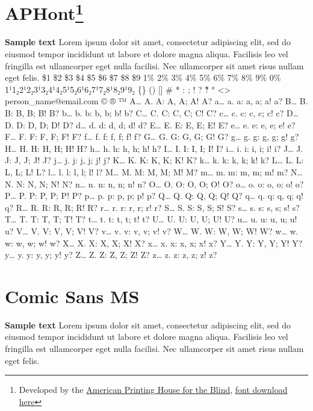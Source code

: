 \pagebreak
\hypertarget{trouble7}{}\section[APHont]{APHont\footnote{\raggedright Developed by the \href{https://www.aph.org/resources/large-print-guidelines/}{American Printing House for the Blind}, \href{https://www.aph.org/resources/large-print-guidelines/}{font download here}}}\label{trouble7}
\textbf{Sample text}
\sffamily \break Lorem ipsum dolor sit amet, consectetur adipiscing elit, sed do eiusmod tempor incididunt ut labore et dolore magna aliqua. Facilisis leo vel fringilla est ullamcorper eget nulla facilisi. Nec ullamcorper sit amet risus nullam eget felis.
\break \$1 \$2 \$3 \$4 \$5 \$6 \$7 \$8 \$9 1\% 2\% 3\% 4\% 5\% 6\% 7\% 8\% 9\% 0\%
\break 1¹1₂2¹2₂3¹3₂4¹4₂5¹5₂6¹6₂7¹7₂8¹8₂9¹9₂
\break \{\} () [] \# * : ; ! ? ‽ ° <> person\_name@email.com © ® ™
\break A… A. A: A, A; A! A? a… a. a: a, a; a! a?
\break B… B. B: B, B; B! B? b… b. b: b, b; b! b?
\break C… C. C: C, C; C! C? c… c. c: c, c; c! c?
\break D… D. D: D, D; D! D? d… d. d: d, d; d! d?
\break E… E. E: E, E; E! E? e… e. e: e, e; e! e?
\break F… F. F: F, F; F! F? f… f. f: f, f; f! f?
\break G… G. G: G, G; G! G? g… g. g: g, g; g! g?
\break H… H. H: H, H; H! H? h… h. h: h, h; h! h?
\break I… I. I: I, I; I! I? i… i. i: i, i; i! i?
\break J… J. J: J, J; J! J? j… j. j: j, j; j! j?
\break K… K. K: K, K; K! K? k… k. k: k, k; k! k?
\break L… L. L: L, L; L! L? l… l. l: l, l; l! l?
\break M… M. M: M, M; M! M? m… m. m: m, m; m! m?
\break N… N. N: N, N; N! N? n… n. n: n, n; n! n?
\break O… O. O: O, O; O! O? o… o. o: o, o; o! o?
\break P… P. P: P, P; P! P? p… p. p: p, p; p! p?
\break Q… Q. Q: Q, Q; Q! Q? q… q. q: q, q; q! q?
\break R… R. R: R, R; R! R? r… r. r: r, r; r! r?
\break S… S. S: S, S; S! S? s… s. s: s, s; s! s?
\break T… T. T: T, T; T! T? t… t. t: t, t; t! t?
\break U… U. U: U, U; U! U? u… u. u: u, u; u! u?
\break V… V. V: V, V; V! V? v… v. v: v, v; v! v?
\break W… W. W: W, W; W! W? w… w. w: w, w; w! w?
\break X… X. X: X, X; X! X? x… x. x: x, x; x! x?
\break Y… Y. Y: Y, Y; Y! Y? y… y. y: y, y; y! y?
\break Z… Z. Z: Z, Z; Z! Z? z… z. z: z, z; z! z?
\pagebreak
\normalfont
\hypertarget{trouble9}{}\section[Comic Sans MS]{Comic Sans MS}\label{trouble9}
\textbf{Sample text}
\ComicSans \break Lorem ipsum dolor sit amet, consectetur adipiscing elit, sed do eiusmod tempor incididunt ut labore et dolore magna aliqua. Facilisis leo vel fringilla est ullamcorper eget nulla facilisi. Nec ullamcorper sit amet risus nullam eget felis.
